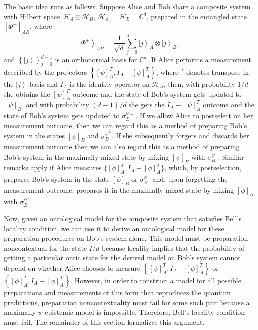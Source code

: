 \documentclass[DIV=calc,paper=a4,fontsize=11pt,twocolumn]{scrartcl} %
\theoremstyle{definition}
\theoremstyle{plain}
\newcommand{\Ket}[1]{\ensuremath{\left \vert #1 \right \rangle}}
\newcommand{\Proj}[1]{\ensuremath{\left [ #1 \right ]}}
\newcommand{\Hilb}[1][]{\ensuremath{\mathcal{H}_{#1}}}
\begin{document}
The basic idea runs as follows.  Suppose Alice and Bob share a
composite system with Hilbert space $\Hilb[A] \otimes \Hilb[B]$,
$\Hilb[A]=\Hilb[B]=\mathbb{C}^d$, prepared in the entangled state
$\Proj{\Phi^+}_{AB}$, where
\begin{equation}
\Ket{\Phi^+}_{AB} = \frac{1}{\sqrt{d}} \sum_{j=0}^{d-1} \Ket{j}_A \otimes
\Ket{j}_B,
\end{equation}
and $\left \{ \Ket{j} \right \}_{j=0}^{d-1}$ is an orthonormal basis
for $\mathbb{C}^d$.  If Alice performs a measurement described by the
projectors $\left \{ \Proj{\psi}_A^T, I_A - \Proj{\psi}_A^T \right
\}$, where $^T$ denotes transpose in the $\Ket{j}$ basis and $I_A$ is
the identity operator on $\Hilb[A]$, then, with probability $1/d$ she
obtains the $\Proj{\psi}_A^T$ outcome and the state of Bob's system
gets updated to $\Proj{\psi}_B$, and with probability $(d-1)/d$ she
gets the $I_A - \Proj{\psi}_A^T$ outcome and the state of Bob's system
gets updated to $\sigma^{\psi{\perp}}_B$.  If we allow Alice to
postselect on her measurement outcome, then we can regard this as a
method of preparing Bob's system in the states $\Proj{\psi}_B$ and
$\sigma^{\psi^{\perp}}_B$.  If she subsequently forgets and discards
her measurement outcome then we can also regard this as a method of
preparing Bob's system in the maximally mixed state by mixing
$\Proj{\psi}_B$ with $\sigma^{\psi^{\perp}}_B$.  Similar remarks apply
if Alice measures $\{\Proj{\phi}^T_A, I_A - \Proj{\phi}^T_A\}$, which,
by postselection, prepares Bob's system in the state $\Proj{\phi}_B$
or $\sigma^{\phi^{\perp}}_B$ and, upon forgetting the measurement
outcome, prepares it in the maximally mixed state by mixing
$\Proj{\phi}_B$ with $\sigma^{\phi^{\perp}}_B$.

Now, given an ontological model for the composite system that
satisfies Bell's locality condition, we can use it to derive an
ontological model for these preparation procedures on Bob's system
alone.  This model must be preparation noncontextual for the state
$I/d$ because locality implies that the probability of getting a
particular ontic state for the derived model on Bob's system cannot
depend on whether Alice chooses to measure $\left \{ \Proj{\psi}^T_A,
I_A - \Proj{\psi}^T_A \right \}$ or $\left \{ \Proj{\phi}^T_A, I_A -
\Proj{\phi}^T_A \right \}$.  However, in order to construct a model
for all possible preparations and measurements of this form that
reproduces the quantum predictions, preparation noncontextuality
must fail for some such pair because a maximally $\psi$-epistemic
model is impossible.  Therefore, Bell's locality condition must fail.
The remainder of this section formalizes this argument.
\end{document}
